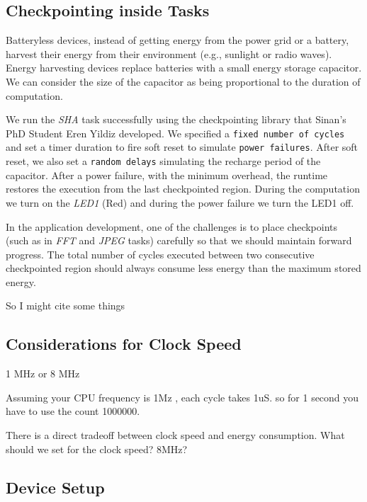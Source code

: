 \documentclass[]{article}
\begin{document}
\hypertarget{checkpointing-inside-tasks}{%
\subsection{Checkpointing inside Tasks}\label{checkpointing-inside-tasks}}

Batteryless devices, instead of getting energy from the power grid or a battery, harvest their energy from their environment (e.g., sunlight or radio waves). Energy harvesting devices replace batteries with a small energy storage capacitor. We can consider the size of the capacitor as being proportional to the duration of computation.

We run the \emph{SHA} task successfully using the checkpointing library that Sinan's PhD Student Eren Yildiz developed. We specified a \texttt{fixed\ number\ of\ cycles} and set a timer duration to fire soft reset to simulate \texttt{power\ failures}. After soft reset, we also set a \texttt{random\ delays} simulating the recharge period of the capacitor. After a power failure, with the minimum overhead, the runtime restores the execution from the last checkpointed region. During the computation we turn on the \emph{LED1} (Red) and during the power failure we turn the LED1 off.

In the application development, one of the challenges is to place checkpoints (such as in \emph{FFT} and \emph{JPEG} tasks) carefully so that we should maintain forward progress. The total number of cycles executed between two consecutive checkpointed region should always consume less energy than the maximum stored energy.

So I might cite some things \citep{Shea2014}

\hypertarget{considerations-for-clock-speed}{%
\subsection{Considerations for Clock Speed}\label{considerations-for-clock-speed}}

1 MHz or 8 MHz

Assuming your CPU frequency is 1Mz , each cycle takes 1uS. so for 1 second you have to use the count 1000000.

There is a direct tradeoff between clock speed and energy consumption. What should we set for the clock speed? 8MHz?

\hypertarget{device-setup}{%
\subsection{Device Setup}\label{device-setup}}
\end{document}
